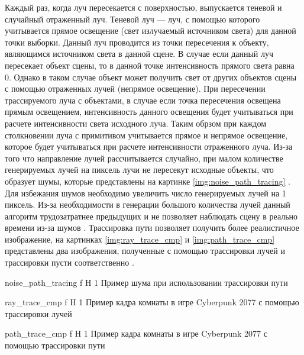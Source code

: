 Каждый раз, когда луч пересекается с поверхностью, выпускается теневой и случайный отраженный луч.
Теневой луч --- луч, с помощью которого учитывается прямое освещение (свет излучаемый источником света) для данной точки выборки. Данный луч проводится из 
точки пересечения к объекту, являющимся источником света в данной сцене. В случае если данный луч пересекает объект сцены, то в данной точке интенсивность
прямого света равна 0. Однако в таком случае объект может получить свет от других объектов сцены с помощью отраженных лучей (непрямое освещение). При пересечении трассируемого луча
с объектами, в случае если  точка пересечения освещена прямым освещением, интенсивность данного освещения будет учитываться при расчете интенсивности света исходного луча.
Таким обрзом при каждом столкновении луча с примитивом учитывается прямое и непрямое освещение, которое будет учитываться при расчете интенсивности отраженного луча.
Из-за того что направление лучей рассчитывается случайно, при малом количестве генерируемых лучей на пиксель лучи не пересекут исходные объекты, что образует шумы, которые 
представлены на картинке \ref{img:noise_path_tracing} \cite{path_tracing, ray_path_tracing}. Для избежания шумов необходимо увеличить число генерируемых лучей на 1 пиксель.
Из-за необходимости в генерации большого количества лучей данный алгоритм трудозатратнее предыдущих и не позволяет наблюдать сцену в реально времени из-за шумов \cite{path_tracing}.
Трассировка пути позволяет получить более реалистичное изображение, на картинках \ref{img:ray_trace_cmp} и \ref{img:path_trace_cmp} представлены два изображения,
полученные с помощью трассировки лучей и трассировки пусти соответственно \cite{cyber_trce}.




{noise_path_tracing} %
{f} %
{H} %
{1\textwidth} %
{Пример шума при использовании трассировки пути} %



{ray_trace_cmp} %
{f} %
{H} %
{1\textwidth} %
{Пример кадра комнаты в игре Cyberpunk 2077 с помощью трассировки лучей} %

{path_trace_cmp} %
{f} %
{H} %
{1\textwidth} %
{Пример кадра комнаты в игре Cyberpunk 2077 с помощью трассировки пути} %







